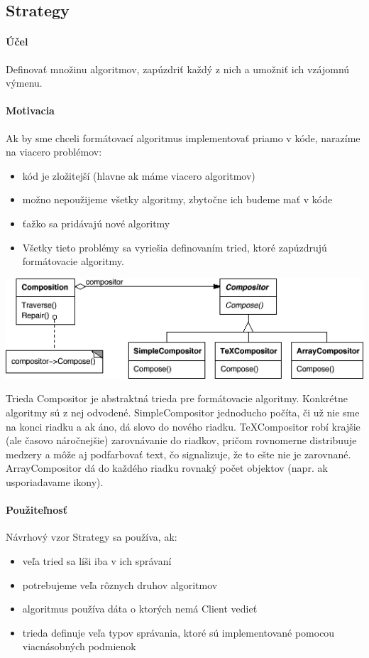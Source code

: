 	\subsection{Strategy}
		\paragraph{Účel}
			Definovať množinu algoritmov, zapúzdriť každý z nich a umožniť ich vzájomnú výmenu.
		\paragraph{Motivacia}
			Ak by sme chceli formátovací algoritmus implementovať priamo v kóde, narazíme na viacero problémov:
				\begin{itemize}
					\item kód je zložitejší (hlavne ak máme viacero algoritmov)
					\item možno nepoužijeme všetky algoritmy, zbytočne ich budeme mať v kóde
					\item ťažko sa pridávajú nové algoritmy
					\item Všetky tieto problémy sa vyriešia definovaním tried, ktoré zapúzdrujú formátovacie algoritmy.\\
				\end{itemize}

				\includegraphics[width=.9\textwidth]{images/programovanie/strategy1}

		Trieda Compositor je abstraktná trieda pre formátovacie algoritmy. Konkrétne algoritmy sú z nej odvodené. SimpleCompositor jednoducho počíta, či už nie sme na konci riadku a ak áno, dá slovo do nového riadku. TeXCompositor robí krajšie (ale časovo náročnejšie) zarovnávanie do riadkov, pričom rovnomerne distribuuje medzery a môže aj podfarbovať text, čo signalizuje, že to ešte nie je zarovnané. ArrayCompositor dá do každého riadku rovnaký počet objektov (napr. ak usporiadavame ikony).


		\paragraph{Použiteľnosť}
			Návrhový vzor Strategy sa používa, ak:
			\begin{itemize}
				\item veľa tried sa líši iba v ich správaní
				\item potrebujeme veľa rôznych druhov algoritmov
				\item algoritmus používa dáta o ktorých nemá Client vedieť
				\item trieda definuje veľa typov správania, ktoré sú implementované pomocou viacnásobných podmienok
			\end{itemize}
